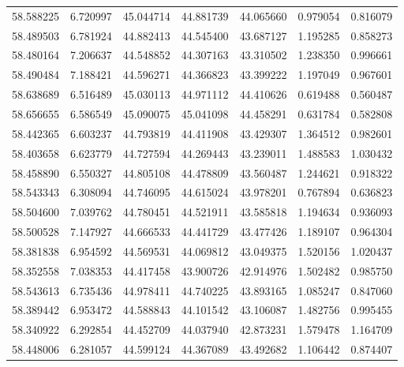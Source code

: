\begin{tabular}{rrrrrrr}
 58.588225 &   6.720997 &         45.044714 &         44.881739 &         44.065660 &  0.979054 &  0.816079 \\
 58.489503 &   6.781924 &         44.882413 &         44.545400 &         43.687127 &  1.195285 &  0.858273 \\
 58.480164 &   7.206637 &         44.548852 &         44.307163 &         43.310502 &  1.238350 &  0.996661 \\
 58.490484 &   7.188421 &         44.596271 &         44.366823 &         43.399222 &  1.197049 &  0.967601 \\
 58.638689 &   6.516489 &         45.030113 &         44.971112 &         44.410626 &  0.619488 &  0.560487 \\
 58.656655 &   6.586549 &         45.090075 &         45.041098 &         44.458291 &  0.631784 &  0.582808 \\
 58.442365 &   6.603237 &         44.793819 &         44.411908 &         43.429307 &  1.364512 &  0.982601 \\
 58.403658 &   6.623779 &         44.727594 &         44.269443 &         43.239011 &  1.488583 &  1.030432 \\
 58.458890 &   6.550327 &         44.805108 &         44.478809 &         43.560487 &  1.244621 &  0.918322 \\
 58.543343 &   6.308094 &         44.746095 &         44.615024 &         43.978201 &  0.767894 &  0.636823 \\
 58.504600 &   7.039762 &         44.780451 &         44.521911 &         43.585818 &  1.194634 &  0.936093 \\
 58.500528 &   7.147927 &         44.666533 &         44.441729 &         43.477426 &  1.189107 &  0.964304 \\
 58.381838 &   6.954592 &         44.569531 &         44.069812 &         43.049375 &  1.520156 &  1.020437 \\
 58.352558 &   7.038353 &         44.417458 &         43.900726 &         42.914976 &  1.502482 &  0.985750 \\
 58.543613 &   6.735436 &         44.978411 &         44.740225 &         43.893165 &  1.085247 &  0.847060 \\
 58.389442 &   6.953472 &         44.588843 &         44.101542 &         43.106087 &  1.482756 &  0.995455 \\
 58.340922 &   6.292854 &         44.452709 &         44.037940 &         42.873231 &  1.579478 &  1.164709 \\
 58.448006 &   6.281057 &         44.599124 &         44.367089 &         43.492682 &  1.106442 &  0.874407 \\

\end{tabular}
